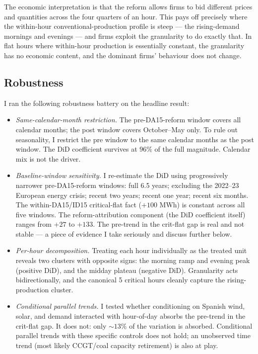 \documentclass[11pt,a4paper]{article}
\begin{document}
The economic interpretation is that the reform allows firms to bid different prices and quantities across the four quarters of an hour. This pays off precisely where the within-hour conventional-production profile is steep --- the rising-demand mornings and evenings --- and firms exploit the granularity to do exactly that. In flat hours where within-hour production is essentially constant, the granularity has no economic content, and the dominant firms' behaviour does not change.

\subsection{Robustness}

I ran the following robustness battery on the headline result:

\begin{itemize}
  \item \emph{Same-calendar-month restriction.} The pre-DA15-reform window covers all calendar months; the post window covers October--May only. To rule out seasonality, I restrict the pre window to the same calendar months as the post window. The DiD coefficient survives at $96\%$ of the full magnitude. Calendar mix is not the driver.
  \item \emph{Baseline-window sensitivity.} I re-estimate the DiD using progressively narrower pre-DA15-reform windows: full 6.5 years; excluding the 2022--23 European energy crisis; recent two years; recent one year; recent six months. The within-DA15/ID15 critical-flat fact ($+100$ MWh) is constant across all five windows. The reform-attribution component (the DiD coefficient itself) ranges from $+27$ to $+133$. The pre-trend in the crit-flat gap is real and not stable --- a piece of evidence I take seriously and discuss further below.
  \item \emph{Per-hour decomposition.} Treating each hour individually as the treated unit reveals two clusters with opposite signs: the morning ramp and evening peak (positive DiD), and the midday plateau (negative DiD). Granularity acts bidirectionally, and the canonical 5 critical hours cleanly capture the rising-production cluster.
  \item \emph{Conditional parallel trends.} I tested whether conditioning on Spanish wind, solar, and demand interacted with hour-of-day absorbs the pre-trend in the crit-flat gap. It does not: only $\sim 13\%$ of the variation is absorbed. Conditional parallel trends with these specific controls does not hold; an unobserved time trend (most likely CCGT/coal capacity retirement) is also at play.

\end{itemize}
\end{document}
